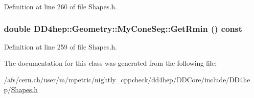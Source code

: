 Definition at line 260 of file Shapes.h.\hypertarget{class_d_d4hep_1_1_geometry_1_1_my_cone_seg_ab706706bc293f463fa5a70881f1c4bac}{
\subsubsection[{GetRmin}]{\setlength{\rightskip}{0pt plus 5cm}double DD4hep::Geometry::MyConeSeg::GetRmin () const}}
\label{class_d_d4hep_1_1_geometry_1_1_my_cone_seg_ab706706bc293f463fa5a70881f1c4bac}


Definition at line 259 of file Shapes.h.

The documentation for this class was generated from the following file:\begin{DoxyCompactItemize}
\item 
/afs/cern.ch/user/m/mpetric/nightly\_\-cppcheck/dd4hep/DDCore/include/DD4hep/\hyperlink{_shapes_8h}{Shapes.h}\end{DoxyCompactItemize}
